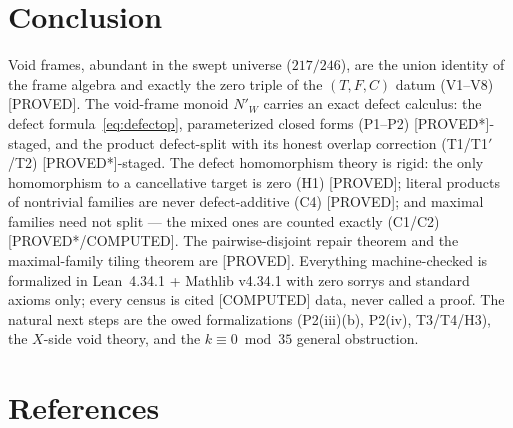 \documentclass[11pt,a4paper]{article}
\theoremstyle{definition}
\begin{document}
\section{Conclusion}

Void frames, abundant in the swept universe ($217/246$), are the union
identity of the frame algebra and exactly the zero triple of the
$(T,F,C)$ datum (V1--V8) [PROVED]. The void-frame monoid $N'_W$ carries
an exact defect calculus: the defect formula~\eqref{eq:defectop},
parameterized closed forms (P1--P2) [PROVED*]-staged, and the
product defect-split with its honest overlap correction (T1/T1$'$/T2)
[PROVED*]-staged. The defect homomorphism theory is rigid: the only
homomorphism to a cancellative target is zero (H1) [PROVED]; literal
products of nontrivial families are never defect-additive (C4)
[PROVED]; and maximal families need not split — the mixed ones are
counted exactly (C1/C2) [PROVED*/COMPUTED]. The pairwise-disjoint
repair theorem and the maximal-family tiling theorem are [PROVED].
Everything machine-checked is formalized in Lean~4.34.1 + Mathlib
v4.34.1 with zero sorrys and standard axioms only; every census is
cited [COMPUTED] data, never called a proof. The natural next steps are
the owed formalizations (P2(iii)(b), P2(iv), T3/T4/H3), the $X$-side
void theory, and the $k\equiv0\bmod35$ general obstruction.

\section{References}
\end{document}
